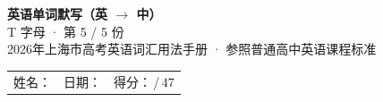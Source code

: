 \documentclass[10pt,a4paper]{article}
\begin{document}
\pagestyle{plain}

\begin{center}
{\LARGE\bfseries 英语单词默写（英 $\to$ 中）}\\[0.22em]
{\large T 字母 · 第 5 / 5 份}\\[0.18em]
{\small 2026年上海市高考英语词汇用法手册 · 参照普通高中英语课程标准}
\end{center}

\vspace{0.25em}
\noindent\begin{tabular}{@{}p{}@{}p{}@{}p{}@{}}
姓名：\underline{\hspace{2.0cm}} & 日期：\underline{\hspace{2.0cm}} & 得分：\underline{\hspace{1.3cm}}\,/\,47 \\
\end{tabular}

\vspace{0.3em}

\vspace{0.08em}
\end{document}
